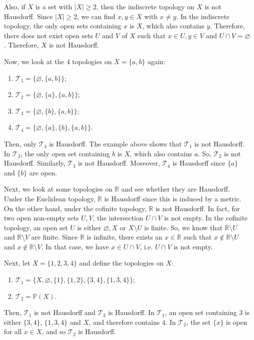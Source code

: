\documentclass[a4paper, openany]{memoir}
\theoremstyle{definition}
\theoremstyle{plain}
\begin{document}
Also, if $X$ is a set with $|X| \geqslant 2$, then the indiscrete topology on $X$ is not Hausdorff. Since $|X| \geqslant 2$, we can find $x, y \in X$ with $x \neq y$. In the indiscrete topology, the only open sets containing $x$ is $X$, which also contains $y$. Therefore, there does not exist open sets $U$ and $V$ of $X$ such that $x \in U, y \in V$ and $U \cap V = \varnothing$. Therefore, $X$ is not Hausdorff.

Now, we look at the 4 topologies on $X = \{a, b\}$ again:
\begin{enumerate}
    \item $\mathcal{T}_1 = \{\varnothing, \{a, b\}\}$;
    \item $\mathcal{T}_2 = \{\varnothing, \{a\}, \{a, b\}\}$;
    \item $\mathcal{T}_3 = \{\varnothing, \{b\}, \{a, b\}\}$;
    \item $\mathcal{T}_4 = \{\varnothing, \{a\}, \{b\}, \{a, b\}\}$.
\end{enumerate}
Then, only $\mathcal{T}_4$ is Hausdorff. The example above shows that $\mathcal{T}_1$ is not Hausdorff. In $\mathcal{T}_2$, the only open set containing $b$ is $X$, which also contains $a$. So, $\mathcal{T}_2$ is not Hausdorff. Similarly, $\mathcal{T}_3$ is not Hausdorff. Moreover, $\mathcal{T}_4$ is Hausdorff since $\{a\}$ and $\{b\}$ are open.

Next, we look at some topologies on $\mathbb{R}$ and see whether they are Hausdorff. Under the Euclidean topology, $\mathbb{R}$ is Hausdorff since this is induced by a metric. On the other hand, under the cofinite topology, $\mathbb{R}$ is not Hausdorff. In fact, for two open non-empty sets $U, V$, the intersection $U \cap V$ is not empty. In the cofinite topology, an open set $U$ is either $\varnothing, X$ or $X \setminus U$ is finite. So, we know that $\mathbb{R} \setminus U$ and $\mathbb{R} \setminus V$ are finite. Since $\mathbb{R}$ is infinite, there exists an $x \in \mathbb{R}$ such that $x \not\in \mathbb{R} \setminus U$ and $x \not\in \mathbb{R} \setminus V$. In that case, we have $x \in U \cap V$, i.e. $U \cap V$ is not empty.

Next, let $X = \{1, 2, 3, 4\}$ and define the topologies on $X$:
\begin{enumerate}
    \item $\mathcal{T}_1 = \{X, \varnothing, \{1\}, \{1, 2\}, \{3, 4\}, \{1, 3, 4\}\}$;
    \item $\mathcal{T}_2 = \mathbb{P}(X)$.
\end{enumerate}
Then, $\mathcal{T}_1$ is not Hausdorff and $\mathcal{T}_2$ is Hausdorff. In $\mathcal{T}_1$, an open set containing $3$ is either $\{3, 4\}$, $\{1, 3, 4\}$ and $X$, and therefore contains $4$. In $\mathcal{T}_2$, the set $\{x\}$ is open for all $x \in X$, and so $\mathcal{T}_2$ is Hausdorff.
\end{document}
